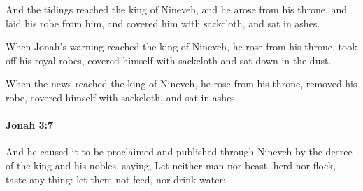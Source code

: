 			\begin{versebox}
					\item[BHS] 
					\item[LXX] 
					\item[ASV] And the tidings reached the king of Nineveh, and he arose from his throne, and laid his robe from him, and covered him with sackcloth, and sat in ashes.
					\item[NIV] When Jonah’s warning reached the king of Nineveh, he rose from his throne, took off his royal robes, covered himself with sackcloth and sat down in the dust.
					\item[NRSV] When the news reached the king of Nineveh, he rose from his throne, removed his robe, covered himself with sackcloth, and sat in ashes.
			\end{versebox}

		\paragraph{Jonah 3:7} %
			\label{JONAH-3-7}

			And he caused it to be proclaimed and published through Nineveh by the decree of the king and his nobles, saying, Let neither man nor beast, herd nor flock, taste any thing: let them not feed, nor drink water:

